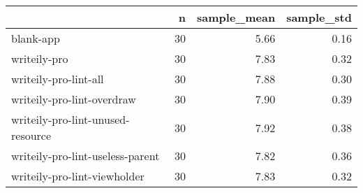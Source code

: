 \begin{tabular}{lrrr}
\toprule
{} &   n &  sample\_mean &  sample\_std \\
\midrule
blank-app                         &  30 &         5.66 &        0.16 \\
writeily-pro                      &  30 &         7.83 &        0.32 \\
writeily-pro-lint-all             &  30 &         7.88 &        0.30 \\
writeily-pro-lint-overdraw        &  30 &         7.90 &        0.39 \\
writeily-pro-lint-unused-resource &  30 &         7.92 &        0.38 \\
writeily-pro-lint-useless-parent  &  30 &         7.82 &        0.36 \\
writeily-pro-lint-viewholder      &  30 &         7.83 &        0.32 \\
\bottomrule
\end{tabular}
